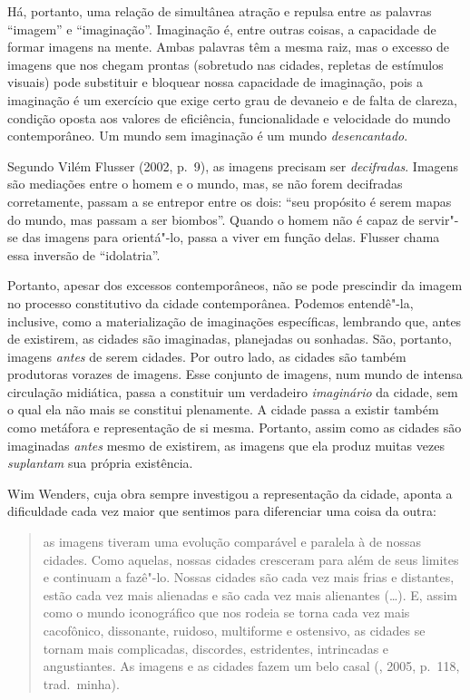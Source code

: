 Há, portanto, uma relação de simultânea atração e repulsa entre as
palavras ``imagem'' e ``imaginação''. Imaginação é, entre outras coisas,
a capacidade de formar imagens na mente. Ambas palavras têm a mesma
raiz, mas o excesso de imagens que nos chegam prontas (sobretudo nas
cidades, repletas de estímulos visuais) pode substituir e bloquear nossa
capacidade de imaginação, pois a imaginação é um exercício que exige
certo grau de devaneio e de falta de clareza, condição oposta aos valores de eficiência,
funcionalidade e velocidade do mundo contemporâneo. Um mundo sem imaginação é um mundo \emph{desencantado}.

Segundo Vilém Flusser (2002, p.~9), as imagens precisam ser
\emph{decifradas}. Imagens são mediações entre o homem e o mundo, mas, \label{decifradas}
se não forem decifradas corretamente, passam a se entrepor entre os
dois: ``seu propósito é serem mapas do mundo, mas passam a ser
biombos''. Quando o homem não é capaz de servir"-se das imagens para
orientá"-lo, passa a viver em função delas. Flusser chama essa inversão
de ``idolatria''.

Portanto, apesar dos excessos contemporâneos, não se pode prescindir da
imagem no processo constitutivo da cidade contemporânea. Podemos
entendê"-la, inclusive, como a materialização de imaginações específicas,
lembrando que, antes de existirem, as cidades são imaginadas, planejadas
ou sonhadas. São, portanto, imagens \emph{antes} de serem cidades. Por
outro lado, as cidades são também produtoras vorazes de imagens. Esse
conjunto de imagens, num mundo de intensa circulação midiática, passa a
constituir um verdadeiro \emph{imaginário} da cidade, sem o qual ela não
mais se constitui plenamente. A cidade passa a existir também como
metáfora e representação de si mesma. Portanto, assim como as cidades
são imaginadas \emph{antes} mesmo de existirem, as imagens que ela
produz muitas vezes \emph{suplantam} sua própria existência.

Wim Wenders, cuja obra sempre investigou a representação da cidade,
aponta a dificuldade cada vez maior que sentimos para diferenciar uma
coisa da outra:

\begin{quote}
as imagens tiveram uma evolução comparável e paralela à de nossas
cidades. Como aquelas, nossas cidades cresceram para além de seus
limites e continuam a fazê"-lo. Nossas cidades são cada vez mais frias e
distantes, estão cada vez mais alienadas e são cada vez mais alienantes
(\ldots{}). E, assim como o mundo iconográfico que nos rodeia se torna cada
vez mais cacofônico, dissonante, ruidoso, multiforme e ostensivo, as
cidades se tornam mais complicadas, discordes, estridentes, intrincadas
e angustiantes. As imagens e as cidades fazem um belo casal (,
2005, p.~118, trad.~minha).
\end{quote}

